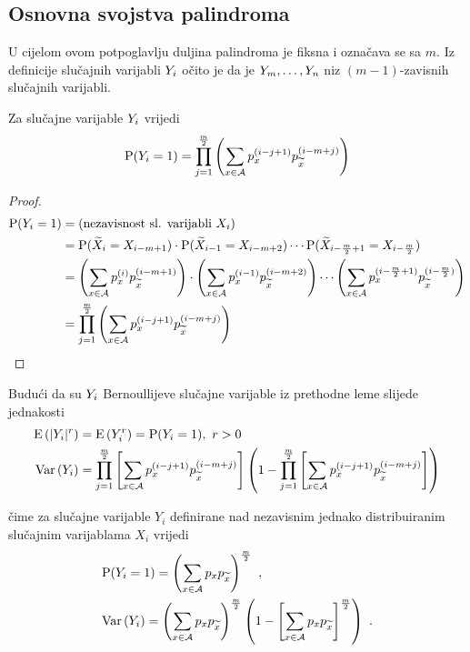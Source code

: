 \subsection{Osnovna svojstva palindroma}

U cijelom ovom potpoglavlju duljina palindroma je
fiksna i označava se sa $m$.
Iz definicije slučajnih varijabli $\tsvar{Y}_i$ očito je da
je $\tsvar{Y}_m,\ldots,\tsvar{Y}_n$ niz $(m-1)$-zavisnih slučajnih varijabli.

\begin{lem}
\label{pal:lem:meanvarpalindroma}
	Za slučajne varijable $\tsvar{Y}_i$  vrijedi
	\[
		\vP( \tsvar{Y}_i = 1) =
		\prod_{j=1}^{\frac{m}{2}} \left(
		\sum_{x \in \mathcal{A}}
		p_x^{(i-j+1)} p_{\ol{x}}^{(i-m+j)}
		\right)
	\]
\end{lem}

\begin{proof}
	\begin{align*}
		\vP( \tsvar{Y}_i = 1) & = 
		\text{(nezavisnost sl. varijabli $\tsvar{X}_i$)} \\
		& =  \vP( \ol{\tsvar{X}}_i = \tsvar{X}_{i-m+1}) \cdot
		\vP( \ol{\tsvar{X}}_{i-1} = \tsvar{X}_{i-m+2}) \cdots
		\vP( \ol{\tsvar{X}}_{i-\frac{m}{2}+1} = \tsvar{X}_{i-\frac{m}{2}}) \\
		& =
		\left(
		\sum_{x \in \mathcal{A}}
		p_x^{(i)} p_{\ol{x}}^{(i-m+1)}
		\right) \cdot
		\left(
		\sum_{x \in \mathcal{A}}
		p_x^{(i-1)} p_{\ol{x}}^{(i-m+2)}
		\right) \cdots
		\left(
		\sum_{x \in \mathcal{A}}
		p_x^{(i-\frac{m}{2}+1)} p_{\ol{x}}^{(i-\frac{m}{2})}
		\right) \\
		& =
		\prod_{j=1}^{\frac{m}{2}} \left(
		\sum_{x \in \mathcal{A}}
		p_x^{(i-j+1)} p_{\ol{x}}^{(i-m+j)}
		\right) 
	\end{align*}
\end{proof}

\noindent
Budući da su $\tsvar{Y}_i$ Bernoullijeve slučajne varijable
iz prethodne leme slijede jednakosti
\begin{align}
	\vE{|\tsvar{Y}_i|^{r}} &=
	\vE{ \tsvar{Y}_i^{r} } = \vP(\tsvar{Y}_i=1),\ r>0
	\\
	\vVar{\tsvar{Y}_i} &= 
		\prod_{j=1}^{\frac{m}{2}} \left[
		\sum_{x \in \mathcal{A}}
		p_x^{(i-j+1)} p_{\ol{x}}^{(i-m+j)}
		\right]
		\left(
		1 -
		\prod_{j=1}^{\frac{m}{2}} \left[
		\sum_{x \in \mathcal{A}}
		p_x^{(i-j+1)} p_{\ol{x}}^{(i-m+j)}
		\right] 
		\right) 
\end{align}

čime za slučajne varijable $Y_i$  definirane
nad nezavisnim jednako distribuiranim slučajnim 
varijablama $X_i$ vrijedi
\begin{align}
	&
	\label{pal:eqn:meanpalindromanjd}
	\vP(\tsvar{Y}_i = 1) =
		\left(
		\sum_{x \in \mathcal{A}}
		p_x p_{\ol{x}}
		\right)^{\frac{m}{2}} \ , \\
	&
	\label{pal:eqn:varpalindromanjd}
	\vVar{Y_i} = 
		\left(
		\sum_{x \in \mathcal{A}}
		p_x p_{\ol{x}}
		\right)^{\frac{m}{2}}
		\left(
		1-
		\left[
		\sum_{x \in \mathcal{A}}
		p_x p_{\ol{x}}
		\right]^{\frac{m}{2}}
		\right) \ .
\end{align}

